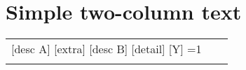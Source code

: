 \documentclass{article}
\makeatletter
\newlength{\bidLeftWidth}\setlength{\bidLeftWidth}{.40\linewidth}
\newlength{\bidRightWidth}\setlength{\bidRightWidth}{.60\linewidth}
\newcounter{bidNeed}
\gdef\bidLabel{}\gdef\bidDesc{}
\gdef\bidLabel{#1}\setcounter{bidNeed}{1}%
\newenvironment{bidsemi}{%
  \par\ttfamily\small\parskip=0pt\parindent=0pt%
  \setcounter{bidNeed}{0}\gdef\bidLabel{}\gdef\bidDesc{}%
  \begin{tabular}{@{}p{\bidLeftWidth}@{\hspace{0.8em}}p{\bidRightWidth}@{}}%
}{%
  \ifnum\value{bidNeed}=1\relax
    {\color{bidLabelColor}\texttt{\bfseries \bidLabel}}{\texttt{\color{bidDescColor}\small\ \bidDesc}} & \\
  \fi
  \end{tabular}\par%
}
\makeatother
\begin{document}
\section*{Simple two-column text}
\begin{bidsemi}
\bid{A}[desc A]
\subbid{A1}
\subbid{A2}[extra]
\subbid{A3}
\bid{B}[desc B]
\subbid{B1}
\subbid{B2}
\bid{C}
\subbid{C1}
\subbid{C2}[detail]
\subsubbid{X}[Y]
\bid{D}
\flushbid
\bid{E}
\subbid{E1}
\end{bidsemi}
\end{document}
